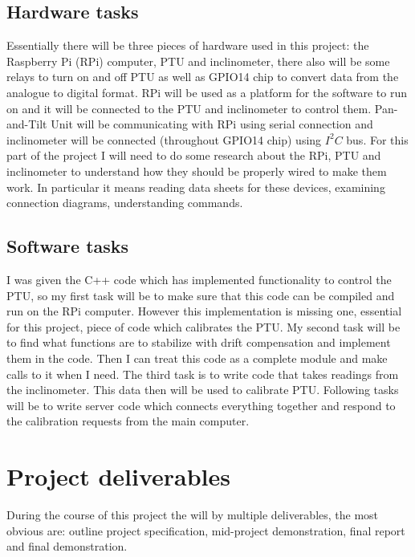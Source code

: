 \documentclass[11pt,fleqn,twoside]{article}
\begin{document}
\subsection{Hardware tasks}
Essentially there will be three pieces of hardware used in this project: the Raspberry Pi (RPi) computer, PTU and inclinometer, there also will be some relays to turn on and off PTU as well as GPIO14 chip to convert data from the analogue to digital format. RPi will be used as a platform for the software to run on and it will be connected to the PTU and inclinometer to control them. Pan-and-Tilt Unit will be communicating with RPi using serial connection and inclinometer will be connected (throughout GPIO14 chip) using \begin{math}I^2 C\end{math} bus. For this part of the project I will need to do some research about the RPi, PTU and inclinometer to understand how they should be properly wired to make them work. In particular it means reading data sheets for these devices, examining connection diagrams, understanding commands.

\subsection{Software tasks}
I was given the C++ code which has implemented functionality to control the PTU, so my first task will be to make sure that this code can be compiled and run on the RPi computer. However this implementation is missing one, essential for this project, piece of code which calibrates the PTU. My second task will be to find what functions are to stabilize with drift compensation and implement them in the code. Then I can treat this code as a complete module and make calls to it when I need. The third task is to write code that takes readings from the inclinometer. This data then will be used to calibrate PTU. Following tasks will be to write server code which connects everything together and respond to the calibration requests from the main computer.

\section{Project deliverables}
During the course of this project the will by multiple deliverables, the most obvious are: outline project specification, mid-project demonstration, final report and final demonstration.
\end{document}
